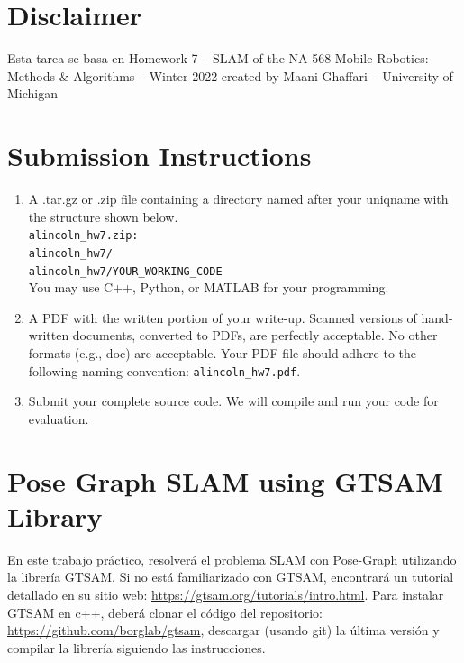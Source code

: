 \documentclass[tp]{lcc}
\begin{document}
\maketitle


\section*{Disclaimer}
Esta tarea se basa en Homework 7 -- SLAM of the NA 568 Mobile Robotics: Methods \& Algorithms -- Winter 2022 created by Maani Ghaffari -- University of Michigan

\section*{Submission Instructions}

\begin{enumerate}
    \item A .tar.gz or .zip file containing a directory named after your uniqname with the structure shown below. \\
    \lstinline[style=bash]{alincoln_hw7.zip:} \\
    \lstinline[style=bash]{alincoln_hw7/} \\
    \lstinline[style=bash]{alincoln_hw7/YOUR_WORKING_CODE} \\
    You may use C++, Python, or MATLAB for your programming.

    \item A PDF with the written portion of your write-up. Scanned versions of hand-written documents, converted to PDFs, are perfectly acceptable. No other formats (e.g., doc) are acceptable. Your PDF file should adhere to the following naming convention: \lstinline[style=bash]{alincoln_hw7.pdf}.

    \item Submit your complete source code. We will compile and run your code for evaluation.
\end{enumerate}

\section*{Pose Graph SLAM using GTSAM Library}
En este trabajo práctico, resolverá el problema SLAM con Pose-Graph utilizando la librería GTSAM. Si no está familiarizado con GTSAM, encontrará un tutorial detallado en su sitio web: \url{https://gtsam.org/tutorials/intro.html}. Para instalar GTSAM en c++, deberá clonar el código del repositorio: \url{https://github.com/borglab/gtsam}, descargar (usando git) la última versión y compilar la librería siguiendo las instrucciones.
\end{document}
